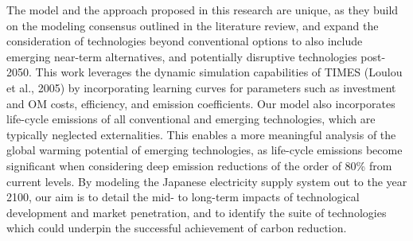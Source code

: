 The model and the approach proposed in this research are unique, as they build on the modeling consensus outlined in the literature review, and expand the consideration of technologies beyond  conventional options to also include emerging near-term alternatives, and potentially disruptive technologies post-2050. This work leverages the dynamic simulation capabilities of \gls{TIMES} (Loulou et al., 2005) by incorporating learning curves for parameters such as investment and \gls{OM} costs, efficiency, and emission coefficients. Our model also incorporates life-cycle emissions of all conventional and emerging technologies, which are typically neglected externalities. This enables a more meaningful analysis of the global warming potential of emerging technologies, as life-cycle emissions become significant when considering deep emission reductions of the order of 80\% from current levels. By modeling the Japanese electricity supply system out to the year 2100, our aim is to detail the mid- to long-term impacts of technological development and market penetration, and to identify the suite of technologies which could underpin the successful achievement of carbon reduction.
